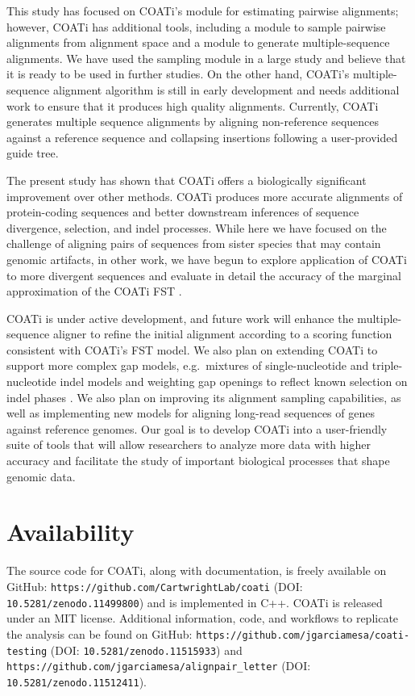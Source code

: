\documentclass[12pt,letterpaper]{article}
\begin{document}
This study has focused on COATi's module for estimating pairwise alignments; however, COATi has additional tools, including a module to sample pairwise alignments from alignment space and a module to generate multiple-sequence alignments. We have used the sampling module in a large study \citep{zhu2022profiling} and believe that it is ready to be used in further studies. On the other hand, COATi's multiple-sequence alignment algorithm is still in early development and needs additional work to ensure that it produces high quality alignments. Currently, COATi generates multiple sequence alignments by aligning non-reference sequences against a reference sequence and collapsing insertions following a user-provided guide tree.

The present study has shown that COATi offers a biologically significant improvement over other methods. COATi produces more accurate alignments of protein-coding sequences and better downstream inferences of sequence divergence, selection, and indel processes. While here we have focused on the challenge of aligning pairs of sequences from sister species that may contain genomic artifacts, in other work, we have begun to explore application of COATi to more divergent sequences and evaluate in detail the accuracy of the marginal approximation of the COATi FST \citep{garcia2023dissertation}.

COATi is under active development, and future work will enhance the multiple-sequence aligner to refine the initial alignment according to a scoring function consistent with COATi's FST model. We also plan on extending COATi to support more complex gap models, e.g.\ mixtures of single-nucleotide and triple-nucleotide indel models and weighting gap openings to reflect known selection on indel phases \citep{zhu2022profiling}. We also plan on improving its alignment sampling capabilities, as well as implementing new models for aligning long-read sequences of genes against reference genomes. Our goal is to develop COATi into a user-friendly suite of tools that will allow researchers to analyze more data with higher accuracy and facilitate the study of important biological processes that shape genomic data.

\section*{Availability}

The source code for COATi, along with documentation, is freely available on GitHub: \nolinkurl{https://github.com/CartwrightLab/coati} (DOI: \nolinkurl{10.5281/zenodo.11499800}) and is implemented in C++. COATi is released under an MIT license. Additional information, code, and workflows to replicate the analysis can be found on GitHub: \nolinkurl{https://github.com/jgarciamesa/coati-testing} (DOI: \nolinkurl{10.5281/zenodo.11515933}) and \nolinkurl{https://github.com/jgarciamesa/alignpair_letter} (DOI: \nolinkurl{10.5281/zenodo.11512411}).
\end{document}
